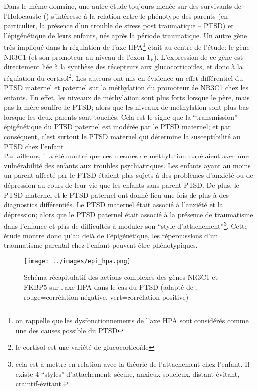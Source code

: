 \documentclass[french]{article}
\begin{document}
				Dans le même domaine, une autre étude toujours menée sur des survivants de l'Holocauste (\cite{yehuda2014}) s'intéresse à la relation entre le phénotype des parents (en particulier, la présence d'un trouble de stress post traumatique -- PTSD) et l'épigénétique de leurs enfants, nés après la période traumatique. Un autre gène très impliqué dans la régulation de l'axe HPA\footnote{on rappelle que les dysfonctionnements de l'axe HPA sont considérés comme une des causes possible du PTSD} était au centre de l'étude: le gène NR3C1 (et son promoteur au niveau de l'exon 1$_F$). L'expression de ce gène est directement liée à la synthèse des récepteurs aux glucocorticoïdes, et donc à la régulation du cortisol\footnote{le cortisol est une variété de glucocorticoïde}. Les auteurs ont mis en évidence un effet différentiel du PTSD maternel et paternel sur la méthylation du promoteur de NR3C1 chez les enfants. En effet, les niveaux de méthylation sont plus forts lorsque le père, mais pas la mère souffre de PTSD; alors que les niveaux de méthylation sont plus bas lorsque les deux parents sont touchés. Cela est le signe que la ``transmission'' épigénétique du PTSD paternel est modérée par le PTSD maternel; et par conséquent, c'est surtout le PTSD maternel qui détermine la susceptibilité au PTSD chez l'enfant.\\
				Par ailleurs, il a été montré que ces mesures de méthylation corrélaient avec une vulnérabilité des enfants aux troubles psychiatriques. Les enfants ayant au moins un parent affecté par le PTSD étaient plus sujets à des problèmes d'anxiété ou de dépression au cours de leur vie que les enfants sans parent PTSD. De plus, le PTSD maternel et le PTSD paternel ont donné lieu une fois de plus à des diagnostics différentiés. Le PTSD maternel était associé à l'anxiété et la dépression; alors que le PTSD paternel était associé à la présence de traumatisme dans l'enfance et plus de difficultés à moduler son ``style d'attachement''\footnote{cela est à mettre en relation avec la théorie de l'attachement chez l'enfant. Il existe 4 ``styles'' d'attachement: sécure, anxieux-soucieux, distant-évitant, craintif-évitant.}. Cette étude montre donc qu'au delà de l'épigénétique, les répercussions d'un traumatisme parental chez l'enfant peuvent être phénotypiques.
				\begin{figure}[H]
					\centering
					\texttt{[image: ../images/epi\_hpa.png]}
					\caption{Schéma récapitulatif des actions complexes des gènes NR3C1 et FKBP5 sur l'axe HPA dans le cas du PTSD (adapté de \cite{yehuda2013}, rouge=corrélation négative, vert=corrélation positive)}
				\end{figure}
\end{document}
